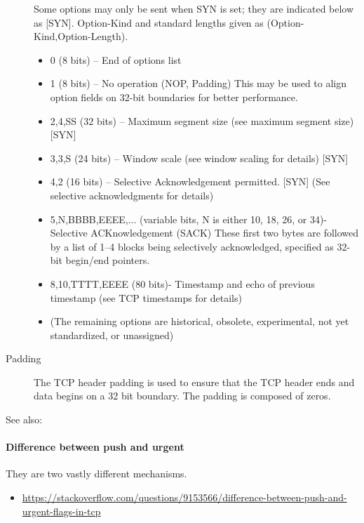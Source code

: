 \begin{description}
  Some options may only be sent when SYN is set; they are indicated below as
  [SYN]. Option-Kind and standard lengths given as (Option-Kind,Option-Length).
  \begin{itemize}
  \item 0 (8 bits) – End of options list
  \item 1 (8 bits) – No operation (NOP, Padding) This may be used to align option fields
    on 32-bit boundaries for better performance.
  \item 2,4,SS (32 bits) – Maximum segment size (see maximum segment size) [SYN]
  \item 3,3,S (24 bits) – Window scale (see window scaling for details)
    [SYN]
  \item 4,2 (16 bits) – Selective Acknowledgement permitted. [SYN] (See selective
    acknowledgments for details)
  \item 5,N,BBBB,EEEE,... (variable bits, N is either 10, 18, 26, or 34)- Selective
    ACKnowledgement (SACK) These first two bytes are
    followed by a list of 1–4 blocks being selectively acknowledged, specified as 32-bit
    begin/end pointers.
  \item 8,10,TTTT,EEEE (80 bits)- Timestamp and echo of previous timestamp (see TCP
    timestamps for details)
  \item[] (The remaining options are historical, obsolete, experimental, not yet
    standardized, or unassigned)
  \end{itemize}
\item[Padding] The TCP header padding is used to ensure that the TCP header ends and data
  begins on a 32 bit boundary. The padding is composed of zeros.
\end{description}

See also: 

\paragraph{Difference between push and urgent}
They are two vastly different mechanisms.

\begin{itemize}
\item \url{https://stackoverflow.com/questions/9153566/difference-between-push-and-urgent-flags-in-tcp}
\end{itemize}

